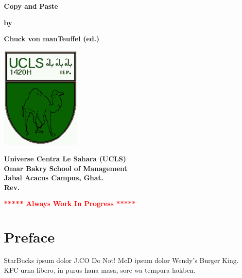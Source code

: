 \documentclass[12pt]{book}
\newcommand{\pengarangs}{%
    Chuck von manTeuffel (ed.)
}
\newcommand{\judul}{%
Copy and Paste
}
\begin{document}
\begin{titlepage}
    \begin{center}    

    \vspace*{15mm}
    \textbf{\Large \judul}

    \vspace*{30mm}       
    \textbf{by}

    \vspace*{15mm}    
    \textbf{\Large \pengarangs}

    \vspace*{4.0cm}

    \begin{center}
        \includegraphics[width=40mm]{ucls-coat}
    \end{center}

    \textbf{
       Universe Centra Le Sahara (UCLS)\\[10pt]
       Omar Bakry School of Management\\[10pt]
       Jabal Acacus Campus, Ghat. \\[10pt]
       Rev. \rev%
    }

    \vspace*{15mm}    
    \textbf{\LARGE \textcolor{red}{***** Always Work In Progress *****}}

    \end{center}

\end{titlepage}


\tableofcontents

\newpage

\chapter*{Preface}

StarBucks ipsum dolor J.CO Do Not!
McD ipsum dolor Wendy’s Burger King. 
KFC urna libero, in purus hana masa, sore wa tempura hokben.
\\[1pt]
\end{document}
